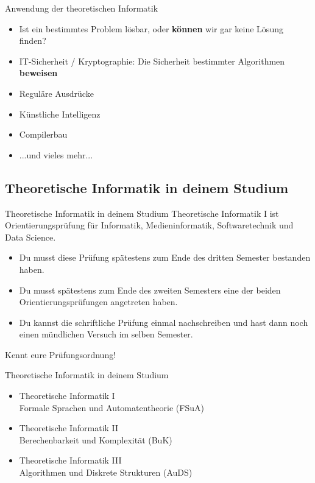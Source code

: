 \begin{frame}{Anwendung der theoretischen Informatik}
    \begin{itemize}
        \item Ist ein bestimmtes Problem lösbar, oder \textbf{können} wir gar keine Lösung finden?
        \item IT-Sicherheit / Kryptographie: Die Sicherheit bestimmter Algorithmen \textbf{beweisen}
        \item Reguläre Ausdrücke
        \item Künstliche Intelligenz
        \item Compilerbau
        \item ...und vieles mehr...
    \end{itemize}
\end{frame}

\subsection{Theoretische Informatik in deinem Studium}
\begin{frame}[fragile]{Theoretische Informatik in deinem Studium}
Theoretische Informatik I ist Orientierungsprüfung für Informatik, Medieninformatik, Softwaretechnik und Data Science.
    \begin{itemize} 
    \item Du musst diese Prüfung spätestens zum Ende des dritten Semester bestanden haben.
    \item Du musst spätestens zum Ende des zweiten Semesters eine der beiden Orientierungsprüfungen angetreten haben.
    \item Du kannst die schriftliche Prüfung einmal nachschreiben und hast dann noch einen mündlichen Versuch im selben Semester.
    \end{itemize}
    \alert{Kennt eure Prüfungsordnung!}
\end{frame}

\begin{frame}{Theoretische Informatik in deinem Studium}
    \begin{itemize}
        \item Theoretische Informatik I\\
        Formale Sprachen und Automatentheorie (FSuA)
        \item Theoretische Informatik II\\
        Berechenbarkeit und Komplexität (BuK)
        \item Theoretische Informatik III\\
        Algorithmen und Diskrete Strukturen (AuDS)
    \end{itemize}
\end{frame}

